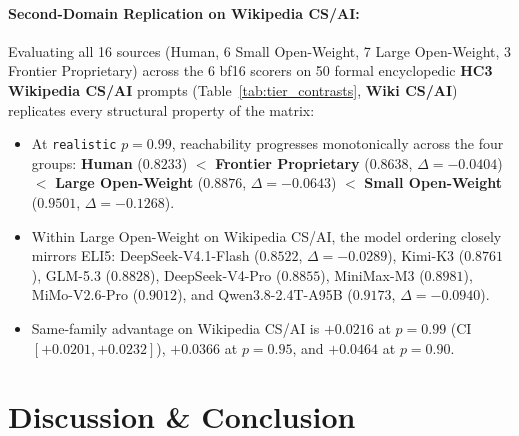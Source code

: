 \documentclass[11pt,a4paper,twocolumn]{article}
\begin{document}
\paragraph{Second-Domain Replication on Wikipedia CS/AI:}
Evaluating all 16 sources (Human, 6 Small Open-Weight, 7 Large Open-Weight, 3 Frontier Proprietary) across the 6 bf16 scorers on 50 formal encyclopedic \textbf{HC3 Wikipedia CS/AI} prompts (Table~\ref{tab:tier_contrasts}, \textbf{Wiki CS/AI}) replicates every structural property of the matrix:
\begin{itemize}
    \item At \texttt{realistic} $p=0.99$, reachability progresses monotonically across the four groups: \textbf{Human} ($0.8233$) $<$ \textbf{Frontier Proprietary} ($0.8638$, $\Delta = -0.0404$) $<$ \textbf{Large Open-Weight} ($0.8876$, $\Delta = -0.0643$) $<$ \textbf{Small Open-Weight} ($0.9501$, $\Delta = -0.1268$).
    \item Within Large Open-Weight on Wikipedia CS/AI, the model ordering closely mirrors ELI5: DeepSeek-V4.1-Flash ($0.8522$, $\Delta = -0.0289$), Kimi-K3 ($0.8761$), GLM-5.3 ($0.8828$), DeepSeek-V4-Pro ($0.8855$), MiniMax-M3 ($0.8981$), MiMo-V2.6-Pro ($0.9012$), and Qwen3.8-2.4T-A95B ($0.9173$, $\Delta = -0.0940$).
    \item Same-family advantage on Wikipedia CS/AI is $+0.0216$ at $p=0.99$ (CI $[+0.0201, +0.0232]$), $+0.0366$ at $p=0.95$, and $+0.0464$ at $p=0.90$.
\end{itemize}

\section{Discussion \& Conclusion}
\end{document}
